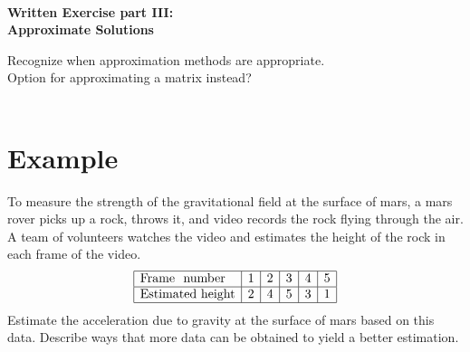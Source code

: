 \documentclass[12pt]{article}
\begin{document}
\thispagestyle{empty}
~
\vspace{-2cm}

\begin{center}
\vspace{-1.5cm}
{\Large{\bfseries  
Written Exercise part III:\\
Approximate Solutions
}
 }  \\[9mm]
\end{center}

Recognize when approximation methods are appropriate. \\

Option for approximating a matrix instead? \\



~
\vspace{-2cm}
\section*{Example}
To measure the strength of the gravitational field at the surface of mars, a mars rover picks up a rock, throws it, and video records the rock flying through the air. A team of volunteers watches the video and estimates the height of the rock in each frame of the video. 
\[
\begin{array}{|l|c|c|c|c|c|}
\hline
\textrm{Frame~ number}& 1&2&3&4&5\\%
\hline
\textrm{Estimated~height}& 2&4&5&3&1\\
\hline
\end{array}
\]
Estimate the acceleration due to gravity at the surface of mars based on this data.
Describe ways that more data can be obtained to yield a better estimation.\\
\end{document}
